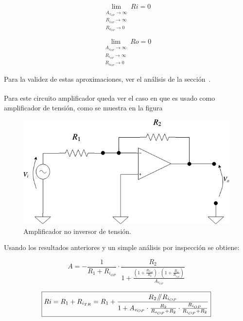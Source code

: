 \begin{equation}
\lim_{\substack{A_{v_{OP}} \to \infty \\ R_{i_{OP}} \to \infty \\ R_{o_{OP}} \to 0}} R{i} = 0
\end{equation}


\begin{equation}
\lim_{\substack{A_{v_{OP}} \to \infty \\ R_{i_{OP}} \to \infty \\ R_{o_{OP}} \to 0}} R{o} = 0
\end{equation}


Para la validez de estas aproximaciones, ver el análisis de la sección~.\\\\

Para este circuito amplificador queda ver el caso en que es usado como amplificador de tensión, como se muestra en la figura~

\begin{figure}[H] %
\begin{center}
\includegraphics[width=0.5 \textwidth, angle=0]{./img/operacionales/OP_INV.png}
\caption{\label{fig:fig_operational_ideal_inverter}\footnotesize{Amplificador no inversor de tensión.}}
\end{center}
\end{figure}

Usando los resultados anteriores y un simple análisis por inspección se obtiene:

\begin{equation}
\boxed{   A = - \frac{1}{R_{1} + R_{i_{OP}}}    \cdot \frac{ R_{2} }{ 1 + \frac{ \left( 1 + \frac{R_{o_{OP}}}{R_{2}} \right) \cdot \left( 1 + \frac{R_{2}}{R_{i_{OP}}} \right)  }{ A_{v_{OP}}  }  }    }
\end{equation}

\begin{equation}
\boxed{ R{i} = R_{1} + R_{i_{TR}} =  R_{1} + \frac{ R_{2} \mathbin{\!/\mkern-5mu/\!} R_{i_{OP}}  }{ 1 + A_{v_{OP}} \cdot \frac{R_{2}}{R_{o_{OP}} + R_{2}} \cdot \frac{R_{i_{OP}}}{R_{i_{OP}} + R_{2}}  }   } 
\end{equation}


